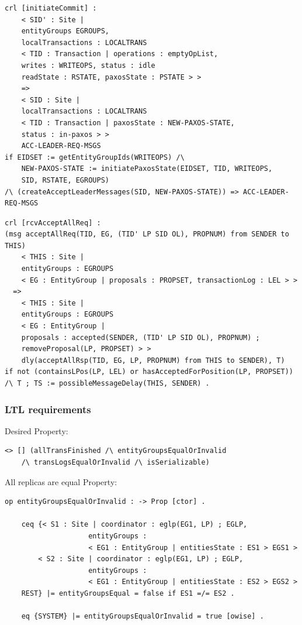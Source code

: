 \documentclass{beamer}
\begin{document}
\begin{frame}[fragile]
    \scriptsize
    \begin{lstlisting}[language=maude]
crl [initiateCommit] :
    < SID' : Site |
    entityGroups EGROUPS,
    localTransactions : LOCALTRANS
    < TID : Transaction | operations : emptyOpList,
    writes : WRITEOPS, status : idle
    readState : RSTATE, paxosState : PSTATE > >
    =>
    < SID : Site |
    localTransactions : LOCALTRANS
    < TID : Transaction | paxosState : NEW-PAXOS-STATE,
    status : in-paxos > >
    ACC-LEADER-REQ-MSGS
if EIDSET := getEntityGroupIds(WRITEOPS) /\
    NEW-PAXOS-STATE := initiatePaxosState(EIDSET, TID, WRITEOPS,
    SID, RSTATE, EGROUPS)
/\ (createAcceptLeaderMessages(SID, NEW-PAXOS-STATE)) => ACC-LEADER-REQ-MSGS
    \end{lstlisting}

\end{frame}
\begin{frame}[fragile]
    \scriptsize 
    \begin{lstlisting}[language=maude]
crl [rcvAcceptAllReq] :
(msg acceptAllReq(TID, EG, (TID' LP SID OL), PROPNUM) from SENDER to THIS)
    < THIS : Site |
    entityGroups : EGROUPS
    < EG : EntityGroup | proposals : PROPSET, transactionLog : LEL > >
  =>
    < THIS : Site |
    entityGroups : EGROUPS
    < EG : EntityGroup |
    proposals : accepted(SENDER, (TID' LP SID OL), PROPNUM) ;
    removeProposal(LP, PROPSET) > >
    dly(acceptAllRsp(TID, EG, LP, PROPNUM) from THIS to SENDER), T)
if not (containsLPos(LP, LEL) or hasAcceptedForPosition(LP, PROPSET))
/\ T ; TS := possibleMessageDelay(THIS, SENDER) .       
    \end{lstlisting}
\end{frame}
\begin{frame}[fragile]
    \frametitle{LTL requirements}
    Desired Property: 
    \begin{lstlisting}[language=maude, basicstyle=\scriptsize]
    <> [] (allTransFinished /\ entityGroupsEqualOrInvalid
    /\ transLogsEqualOrInvalid /\ isSerializable)
    \end{lstlisting}

    \pause
    All replicas are equal Property:
    \begin{lstlisting}[language=maude, basicstyle=\scriptsize]
    op entityGroupsEqualOrInvalid : -> Prop [ctor] .
    
    ceq {< S1 : Site | coordinator : eglp(EG1, LP) ; EGLP,
                    entityGroups :
                    < EG1 : EntityGroup | entitiesState : ES1 > EGS1 >
        < S2 : Site | coordinator : eglp(EG1, LP) ; EGLP,
                    entityGroups :
                    < EG1 : EntityGroup | entitiesState : ES2 > EGS2 >
    REST} |= entityGroupsEqual = false if ES1 =/= ES2 .
    
    eq {SYSTEM} |= entityGroupsEqualOrInvalid = true [owise] .
    \end{lstlisting}
\end{frame}
\end{document}
